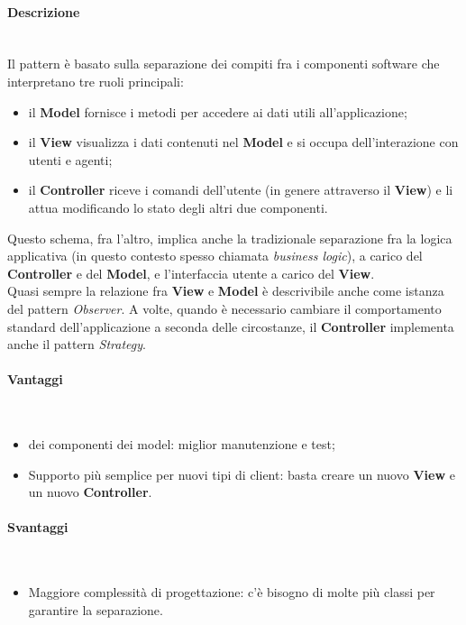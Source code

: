 \paragraph{Descrizione} \mbox{} \\
Il pattern è basato sulla separazione dei compiti fra i componenti software che interpretano tre ruoli principali:
\begin{itemize}
\item il \textbf{Model} fornisce i metodi per accedere ai dati utili all'applicazione;
\item il \textbf{View} visualizza i dati contenuti nel \textbf{Model} e si occupa dell'interazione con utenti e agenti;
\item il \textbf{Controller} riceve i comandi dell'utente (in genere attraverso il \textbf{View}) e li attua modificando lo stato degli altri due componenti.
\end{itemize}
Questo schema, fra l'altro, implica anche la tradizionale separazione fra la logica applicativa (in questo contesto spesso chiamata \textit{business logic}), a carico del \textbf{Controller} e del \textbf{Model}, e l'interfaccia utente a carico del \textbf{View}. \\
Quasi sempre la relazione fra \textbf{View} e \textbf{Model} è descrivibile anche come istanza del pattern \textit{Observer}. A volte, quando è necessario cambiare il comportamento standard dell'applicazione a seconda delle circostanze, il \textbf{Controller} implementa anche il pattern \textit{Strategy}.
\paragraph{Vantaggi} \mbox{} \\
\begin{itemize}
\item {} dei componenti dei model: miglior manutenzione e test;
\item Supporto più semplice per nuovi tipi di client: basta creare un nuovo \textbf{View} e un nuovo \textbf{Controller}.
\end{itemize}
\paragraph{Svantaggi} \mbox{} \\
\begin{itemize}
\item Maggiore complessità di progettazione: c'è bisogno di molte più classi per garantire la separazione.
\end{itemize}
